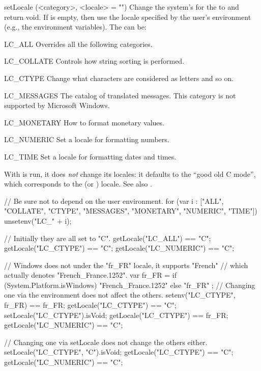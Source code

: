 \begin{urbiscriptapi}
\item[setLocale](<category>, <locale> = "")%
  Change the system's  for the  to 
  and return void.  If  is empty, then use the locale specified
  by the user's environment (e.g., the environment variables).  The
   can be:
  \begin{sublist}
    \begin{envs}
    \item[LC\_ALL] Overrides all the following categories.
    \item[LC\_COLLATE] Controls how string sorting is performed.
    \item[LC\_CTYPE] Change what characters are considered as letters and so
      on.
    \item[LC\_MESSAGES] The catalog of translated messages.  This category
      is not supported by Microsoft Windows.
    \item[LC\_MONETARY] How to format monetary values.
    \item[LC\_NUMERIC] Set a locale for formatting numbers.
    \item[LC\_TIME] Set a locale for formatting dates and times.
    \end{envs}
  \end{sublist}
  With  is run, it does \emph{not} change its locales: it
  defaults to the ``good old C mode'', which corresponds to the  (or
  ) locale.  See also .
\begin{urbicomment}
// Be sure not to depend on the user environment.
for (var i : ["ALL", "COLLATE", "CTYPE", "MESSAGES", "MONETARY",
              "NUMERIC", "TIME"])
  unsetenv("LC_" + i);
\end{urbicomment}
\begin{urbiassert}
// Initially they are all set to "C".
getLocale("LC_ALL")     == "C";
getLocale("LC_CTYPE")   == "C";
getLocale("LC_NUMERIC") == "C";

// Windows does not under the "fr_FR" locale, it supports "French"
// which actually denotes "French_France.1252".
var fr_FR =
  { if (System.Platform.isWindows) "French_France.1252" else "fr_FR" };
// Changing one via the environment does not affect the others.
setenv("LC_CTYPE", fr_FR) == fr_FR;
getLocale("LC_CTYPE")   == "C";
setLocale("LC_CTYPE").isVoid;
getLocale("LC_CTYPE")   == fr_FR;
getLocale("LC_NUMERIC") == "C";

// Changing one via setLocale does not change the others either.
setLocale("LC_CTYPE", "C").isVoid;
getLocale("LC_CTYPE")   == "C";
getLocale("LC_NUMERIC") == "C";


\end{urbiassert}
\end{urbiscriptapi}
